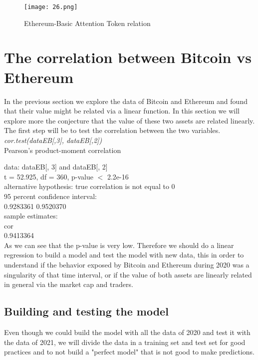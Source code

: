 \documentclass[14pt]{amsart}
\begin{document}
\begin{figure}[h!]
  \texttt{[image: 26.png]}
  \caption{Ethereum-Basic Attention Token relation}
  \label{fig:boat1}
\end{figure}

\section{The correlation between Bitcoin vs Ethereum}
In the previous section we explore the data of Bitcoin and Ethereum and found that their value might be related via a linear function. In this section we will explore more the conjecture that the value of these two assets are related linearly. The first step will be to test the correlation between the two variables.\\

\noindent\textit{cor.test(dataEB[,3], dataEB[,2])}\\

	 Pearson's product-moment correlation

\noindent data:  dataEB[, 3] and dataEB[, 2]\\
t = 52.925, df = 360, p-value $<$ 2.2e-16\\
alternative hypothesis: true correlation is not equal to 0\\
95 percent confidence interval:\\
 0.9283361 0.9520370\\
sample estimates:\\
      cor \\
0.9413364\\

As we can see that the p-value is very low. Therefore we should do a linear regression to build a model and test the model with new data, this in order to understand if the behavior exposed by Bitcoin and Ethereum during 2020 was a singularity of that time interval, or if the value of both assets are linearly related in general via the market cap and traders.

\subsection{Building and testing the model}
Even though we could build the model with all the data of 2020 and test it with the data of 2021, we will divide the data in a training set and test set for good practices and to not build a "perfect model" that is not good to make predictions.
\end{document}
